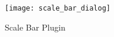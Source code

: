 \begin{figure}[ht]
   \begin{center}
   \caption{Scale Bar Plugin \nixcaption}\label{fig:scale_bar}\smallskip
   \texttt{[image: scale\_bar\_dialog]}
\end{center}  
\end{figure}
